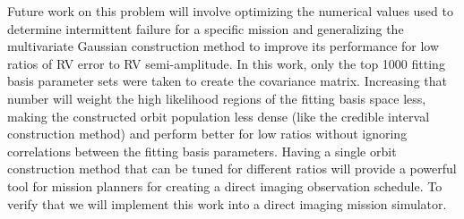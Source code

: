Future work on this problem will involve optimizing the numerical values used to determine
intermittent failure for a specific mission and generalizing the multivariate Gaussian construction
method to improve its performance for low ratios of RV error to RV semi-amplitude. In this work, only
the top 1000 fitting basis parameter sets were taken to create the covariance matrix.  Increasing
that number will weight the high likelihood regions of the fitting basis space less, making the
constructed orbit population less dense (like the credible interval construction method) and perform
better for low ratios without ignoring correlations between the fitting basis parameters.  Having a
single orbit construction method that can be tuned for different ratios will provide a powerful tool
for mission planners for creating a direct imaging observation schedule. To verify that we will
implement this work into a direct imaging mission simulator.


